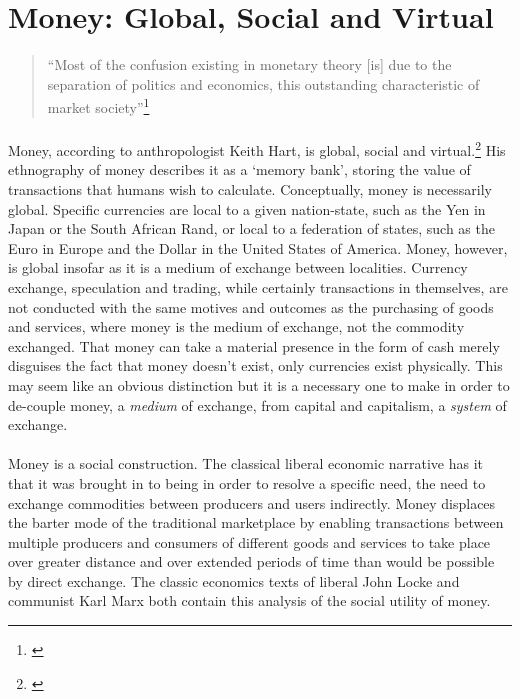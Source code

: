\documentclass[12pt,a4paper,titlepage]{article}
\begin{document}
\newpage
\section{Money: Global, Social and Virtual}
\singlespacing
\begin{quote}
``Most of the confusion existing in monetary theory [is] due to the separation of politics and economics, this outstanding characteristic of market society''\footnote{\cite[p. 195]{Polanyi:1957mi}}
\end{quote}
\doublespacing
\paragraph{}Money, according to anthropologist Keith Hart, is global, social and virtual.\footnote{\cite[Weblog entry, 9th October 2007]{HartKblog2007-2}} His ethnography of money describes it as a `memory bank', storing the value of transactions that humans wish to calculate. Conceptually, money is necessarily global. Specific currencies are local to a given nation-state, such as the Yen in Japan or the South African Rand, or local to a federation of states, such as the Euro in Europe and the Dollar in the United States of America. Money, however, is global insofar as it is a medium of exchange between localities. Currency exchange, speculation and trading, while certainly transactions in themselves, are not conducted with the same motives and outcomes as the purchasing of goods and services, where money is the medium of exchange, not the commodity exchanged. That money can take a material presence in the form of cash merely disguises the fact that money doesn't exist, only currencies exist physically. This may seem like an obvious distinction but it is a necessary one to make in order to de-couple money, a \textit{medium} of exchange, from capital and capitalism, a \textit{system} of exchange.

\paragraph{}Money is a social construction. The classical liberal economic narrative has it that it was brought in to being in order to resolve a specific need, the need to exchange commodities between producers and users indirectly. Money displaces the barter mode of the traditional marketplace by enabling transactions between multiple producers and consumers of different goods and services to take place over greater distance and over extended periods of time than would be possible by direct exchange. The classic economics texts of liberal John Locke and communist Karl Marx both contain this analysis of the social utility of money.
\end{document}
